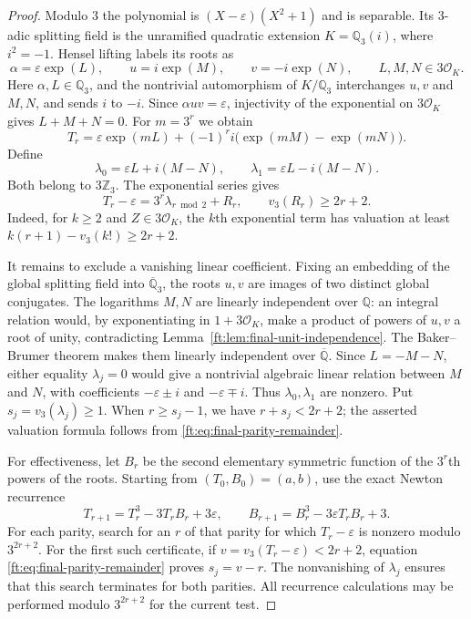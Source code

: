 \documentclass[11pt,a4paper]{article}
\theoremstyle{definition}
\theoremstyle{remark}
\numberwithin{equation}{section}
\begin{document}
\begin{proof}
Modulo $3$ the polynomial is
$(X-\varepsilon)(X^2+1)$ and is separable. Its $3$-adic splitting
field is the unramified quadratic extension $K=\mathbb Q_3(i)$,
where $i^2=-1$. Hensel lifting labels its roots as
\[
 \alpha=\varepsilon\exp(L),\qquad
 u=i\exp(M),\qquad v=-i\exp(N),
 \qquad L,M,N\in3\mathcal O_K.
\]
Here $\alpha,L\in\mathbb Q_3$, and the nontrivial automorphism
of $K/\mathbb Q_3$ interchanges $u,v$ and $M,N$, and sends
$i$ to $-i$. Since $\alpha uv=\varepsilon$, injectivity of the
exponential on $3\mathcal O_K$ gives $L+M+N=0$.
For $m=3^r$ we obtain
\[
 T_r=\varepsilon\exp(mL)+(-1)^r i
                   \bigl(\exp(mM)-\exp(mN)\bigr).
\]
Define
\[
 \lambda_0=\varepsilon L+i(M-N),\qquad
 \lambda_1=\varepsilon L-i(M-N).
\]
Both belong to $3\mathbb Z_3$. The exponential series gives
\begin{equation}
\label{ft:eq:final-parity-remainder}
 T_r-\varepsilon=3^r\lambda_{r\bmod2}+R_r,
 \qquad v_3(R_r)\ge2r+2.
\end{equation}
Indeed, for $k\ge2$ and $Z\in3\mathcal O_K$, the $k$th
exponential term has valuation at least
$k(r+1)-v_3(k!)\ge2r+2$.

It remains to exclude a vanishing linear coefficient. Fixing an
embedding of the global splitting field into $\overline{\mathbb Q}_3$,
the roots $u,v$ are images of two distinct global conjugates.
The logarithms $M,N$ are linearly independent over $\mathbb Q$:
an integral relation would, by exponentiating in
$1+3\mathcal O_K$, make a product of powers of $u,v$ a root
of unity, contradicting Lemma~\ref{ft:lem:final-unit-independence}.
The Baker--Brumer theorem makes them linearly independent over
$\overline{\mathbb Q}$. Since $L=-M-N$, either equality
$\lambda_j=0$ would give a nontrivial algebraic linear relation
between $M$ and $N$, with coefficients
$-\varepsilon\pm i$ and $-\varepsilon\mp i$.
Thus $\lambda_0,\lambda_1$ are nonzero. Put
$s_j=v_3(\lambda_j)\ge1$.
When $r\ge s_j-1$, we have $r+s_j<2r+2$; the asserted
valuation formula follows from \eqref{ft:eq:final-parity-remainder}.

For effectiveness, let $B_r$ be the second elementary symmetric
function of the $3^r$th powers of the roots. Starting from
$(T_0,B_0)=(a,b)$, use the exact Newton recurrence
\begin{equation}
\label{ft:eq:final-unit-newton}
 T_{r+1}=T_r^3-3T_rB_r+3\varepsilon,
 \qquad B_{r+1}=B_r^3-3\varepsilon T_rB_r+3.
\end{equation}
For each parity, search for an $r$ of that parity for which
$T_r-\varepsilon$ is nonzero modulo $3^{2r+2}$.
For the first such certificate, if
$v=v_3(T_r-\varepsilon)<2r+2$, equation
\eqref{ft:eq:final-parity-remainder} proves $s_j=v-r$.
The nonvanishing of $\lambda_j$ ensures that this search
terminates for both parities. All recurrence calculations may be
performed modulo $3^{2r+2}$ for the current test.


\end{proof}
\end{document}
